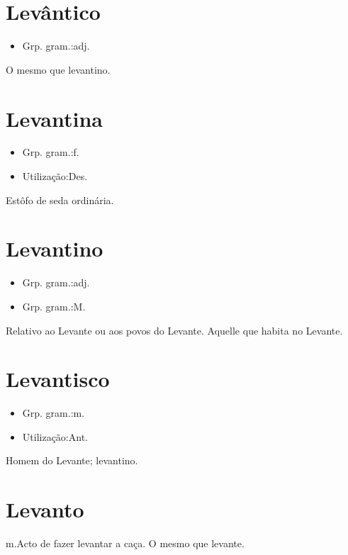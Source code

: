 \section{Levântico}
\begin{itemize}
\item {Grp. gram.:adj.}
\end{itemize}
O mesmo que \textunderscore levantino\textunderscore .
\section{Levantina}
\begin{itemize}
\item {Grp. gram.:f.}
\end{itemize}
\begin{itemize}
\item {Utilização:Des.}
\end{itemize}
Estôfo de seda ordinária.
\section{Levantino}
\begin{itemize}
\item {Grp. gram.:adj.}
\end{itemize}
\begin{itemize}
\item {Grp. gram.:M.}
\end{itemize}
Relativo ao Levante ou aos povos do Levante.
Aquelle que habita no Levante.
\section{Levantisco}
\begin{itemize}
\item {Grp. gram.:m.}
\end{itemize}
\begin{itemize}
\item {Utilização:Ant.}
\end{itemize}
Homem do Levante; levantino.
\section{Levanto}
\textunderscore m.\textunderscore Acto de fazer levantar a caça.
O mesmo que \textunderscore levante\textunderscore .

